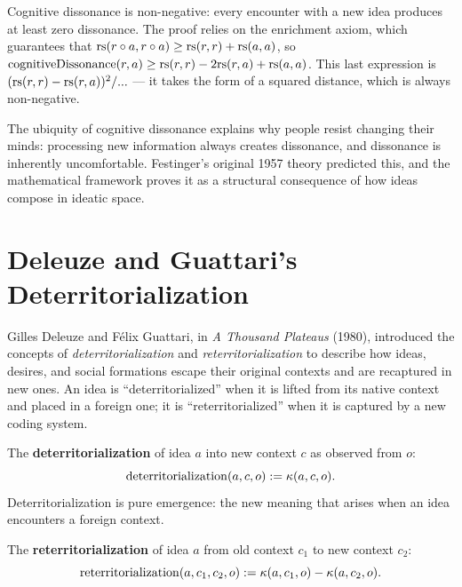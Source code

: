 \begin{interpretation}
Cognitive dissonance is non-negative: every encounter with a new idea
produces at least zero dissonance. The proof relies on the enrichment axiom,
which guarantees that $\mathrm{rs}(r \circ a, r \circ a) \geq \mathrm{rs}(r,r) + \mathrm{rs}(a,a)$,
so $\mathrm{cognitiveDissonance}(r,a) \geq \mathrm{rs}(r,r) - 2\mathrm{rs}(r,a) + \mathrm{rs}(a,a)$.
This last expression is $(\mathrm{rs}(r,r) - \mathrm{rs}(r,a))^2 / ...$ --- it takes the form
of a squared distance, which is always non-negative.

The ubiquity of cognitive dissonance explains why people resist changing their
minds: processing new information always creates dissonance, and dissonance
is inherently uncomfortable. Festinger's original 1957 theory predicted this,
and the mathematical framework proves it as a structural consequence of
how ideas compose in ideatic space.
\end{interpretation}

\section{Deleuze and Guattari's Deterritorialization}

Gilles Deleuze and Félix Guattari, in \emph{A Thousand Plateaus} (1980),
introduced the concepts of \emph{deterritorialization} and
\emph{reterritorialization} to describe how ideas, desires, and social
formations escape their original contexts and are recaptured in new ones.
An idea is ``deterritorialized'' when it is lifted from its native context
and placed in a foreign one; it is ``reterritorialized'' when it is captured
by a new coding system.

\begin{definition}[Deterritorialization]
\label{def:deterritorialization}
The \textbf{deterritorialization} of idea $a$ into new context $c$ as
observed from $o$:
\[
  \mathrm{deterritorialization}(a, c, o) := \kappa(a, c, o).
\]
Deterritorialization is pure emergence: the new meaning that arises when an
idea encounters a foreign context.
\end{definition}

\begin{definition}[Reterritorialization]
\label{def:reterritorialization}
The \textbf{reterritorialization} of idea $a$ from old context $c_1$ to new
context $c_2$:
\[
  \mathrm{reterritorialization}(a, c_1, c_2, o) := \kappa(a, c_1, o) - \kappa(a, c_2, o).
\]
\end{definition}

